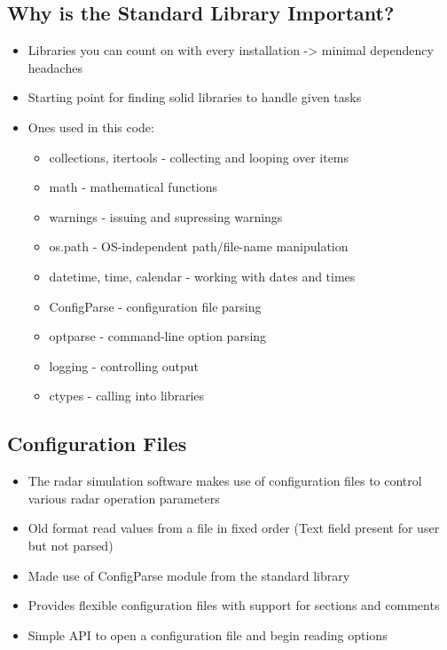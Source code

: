 \documentclass[twocolumn]{article}
\begin{document}
\subsection{Why is the Standard Library Important?}
  \begin{itemize}
    \item Libraries you can count on with every installation -> minimal dependency headaches
    \item Starting point for finding solid libraries to handle given tasks
    \item Ones used in this code:
      \begin{itemize}
        \item collections, itertools - collecting and looping over items
        \item math - mathematical functions
        \item warnings - issuing and supressing warnings
        \item os.path - OS-independent path/file-name manipulation
        \item datetime, time, calendar - working with dates and times
        \item ConfigParse - configuration file parsing
        \item optparse - command-line option parsing
        \item logging - controlling output
        \item ctypes - calling into libraries
      \end{itemize}
  \end{itemize}

\subsection{Configuration Files}
  \begin{itemize}
    \item The radar simulation software makes use of configuration files to
      control various radar operation parameters
    \item Old format read values from a file in fixed order (Text field present for user but not parsed)
    \item Made use of ConfigParse module from the standard library
    \item Provides flexible configuration files with support for sections and comments
    \item Simple API to open a configuration file and begin reading options
  \end{itemize}
\end{document}
